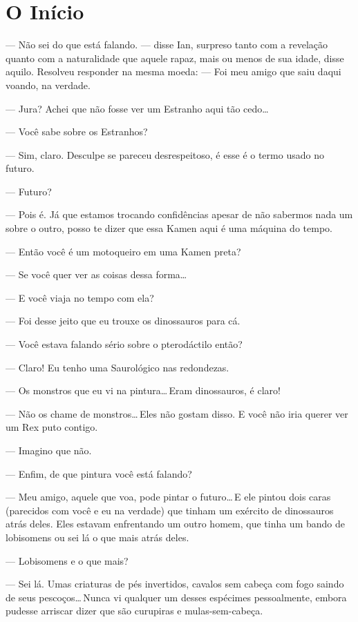 \chapter{O Início}


--- Não sei do que está falando. --- disse Ian, surpreso tanto com a revelação
quanto com a naturalidade que aquele rapaz, mais ou menos de sua idade, disse
aquilo. Resolveu responder na mesma moeda: --- Foi meu amigo que saiu daqui
voando, na verdade.

--- Jura? Achei que não fosse ver um Estranho aqui tão cedo\ldots

--- Você sabe sobre os Estranhos?

--- Sim, claro. Desculpe se pareceu desrespeitoso, é esse é o termo usado no
futuro.

--- Futuro?

--- Pois é. Já que estamos trocando confidências apesar de não sabermos nada um
sobre o outro, posso te dizer que essa Kamen aqui é uma máquina do tempo.

--- Então você é um motoqueiro em uma Kamen preta?

--- Se você quer ver as coisas dessa forma\ldots

--- E você viaja no tempo com ela?

--- Foi desse jeito que eu trouxe os dinossauros para cá.

--- Você estava falando sério sobre o pterodáctilo então?

--- Claro! Eu tenho uma Saurológico nas redondezas.

--- Os monstros que eu vi na pintura\ldots\,Eram dinossauros, é claro!

--- Não os chame de monstros\ldots\,Eles não gostam disso. E você não iria
querer ver um Rex puto contigo.

--- Imagino que não.

--- Enfim, de que pintura você está falando?

--- Meu amigo, aquele que voa, pode pintar o futuro\ldots\,E ele pintou dois
caras (parecidos com você e eu na verdade) que tinham um exército de
dinossauros atrás deles. Eles estavam enfrentando um outro homem, que tinha um
bando de lobisomens ou sei lá o que mais atrás deles.

--- Lobisomens e o que mais?

--- Sei lá. Umas criaturas de pés invertidos, cavalos sem cabeça com fogo
saindo de seus pescoços\ldots\,Nunca vi qualquer um desses espécimes
pessoalmente, embora pudesse arriscar dizer que são curupiras e
mulas-sem-cabeça.

